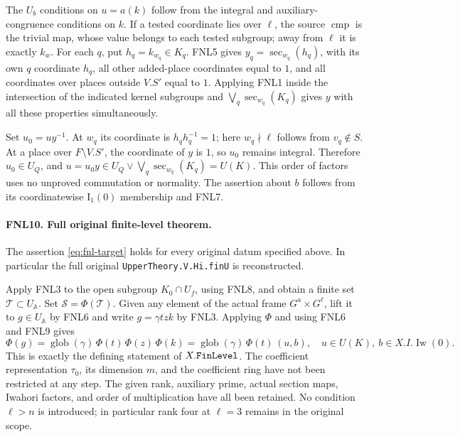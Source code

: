 \documentclass[11pt,a4paper]{article}
\numberwithin{equation}{section}
\theoremstyle{remark}\newtheorem{remark}[theorem]{Remark}
\begin{document}
The \(U_b\) conditions on \(u=a(k)\) follow from the integral and
auxiliary-congruence conditions on \(k\).  If a tested coordinate
lies over \(\ell\), the source \(\operatorname{cmp}\) is the
trivial map, whose value belongs to each tested subgroup; away from
\(\ell\) it is exactly \(k_w\).  For each \(q\), put
\(h_q=k_{w_q}\in K_q\).  FNL5 gives
\(y_q=\operatorname{sec}_{w_q}(h_q)\), with its own \(q\) coordinate
\(h_q\), all other added-place coordinates equal to \(1\), and
all coordinates over places outside \(V.S'\) equal to \(1\).
Applying FNL1 inside the intersection of the indicated kernel
subgroups and \(\bigvee_q\operatorname{sec}_{w_q}(K_q)\) gives
\(y\) with all these properties simultaneously.

Set \(u_0=uy^{-1}\).  At \(w_q\) its coordinate is
\(h_qh_q^{-1}=1\); here \(w_q\nmid\ell\) follows from
\(v_q\notin S\).  At a place over \(F\setminus V.S'\), the
coordinate of \(y\) is \(1\), so \(u_0\) remains integral.
Therefore \(u_0\in U_Q\), and
\(u=u_0y\in U_Q\vee\bigvee_q\operatorname{sec}_{w_q}(K_q)=U(K)\).
This order of factors uses no unproved commutation or normality.
The assertion about \(b\) follows from its coordinatewise
\(\mathrm I_1(0)\) membership and FNL7.

\paragraph{FNL10. Full original finite-level theorem.}
\label{claim:FNL10}
The assertion \eqref{eq:fnl-target} holds for every original datum
specified above.  In particular the full original
\texttt{Upper\allowbreak Theory.\allowbreak V.\allowbreak Hi.\allowbreak fin\allowbreak U} is reconstructed.

Apply FNL3 to the open subgroup \(K_0\cap U_f\), using FNL8,
and obtain a finite set \(\mathcal T\subset U_{\mathbb A}\).
Set \(\mathcal S=\Phi(\mathcal T)\).  Given any element of the
actual frame \(G^a\times G^\ell\), lift it to \(g\in U_{\mathbb A}\)
by FNL6 and write \(g=\gamma t z k\) by FNL3.  Applying \(\Phi\)
and using FNL6 and FNL9 gives
\[
 \Phi(g)=\operatorname{glob}(\gamma)\,\Phi(t)\,\Phi(z)\,\Phi(k)
         =\operatorname{glob}(\gamma)\,\Phi(t)\,(u,\allowbreak{} b),
 \quad u\in U(K),\ b\in X.I.\operatorname{Iw}(0).
\]
This is exactly the defining statement of \(X.\texttt{Fin\allowbreak Level}\).
The coefficient representation \(\tau _0\), its dimension \(m\),
and the coefficient ring have not been restricted at any step.
The given rank, auxiliary prime, actual section maps, Iwahori factors,
and order of multiplication have all been retained.  No condition
\(\ell>n\) is introduced; in particular rank four at \(\ell=3\)
remains in the original scope.
\end{document}
